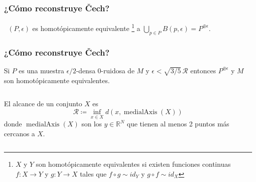 \documentclass{beamer}
\newcommand{\R}{\mathbb{R}}
\newcommand{\RR}{\mathcal{R}}
\DeclareMathOperator{\medialAxis}{medialAxis}
\DeclareMathOperator{\Cech}{\check{C}}
\DeclareMathOperator{\nerve}{nerve}
\begin{document}
\begin{frame}\frametitle{¿Cómo reconstruye \v{C}ech?}

  \begin{Teorema}[Nervio]
    \(\Cech(P,\epsilon)\) es homotópicamente equivalente%
    \footnote[frame]{\(X\) y \(Y\) son homotópicamente equivalentes si existen
    funciones continuas \(f\colon X \to Y\) y \(g\colon Y \to X\)
    tales que \(f\circ g \sim id_Y\) y \(g\circ f \sim id_X\)}
    a \(\bigcup_{p\in P} B(p,\epsilon) = P^{\oplus\epsilon}\).  
  \end{Teorema}

\end{frame}

\begin{frame}\frametitle{¿Cómo reconstruye \v{C}ech?}
  \begin{Teorema}
    Si \(P\) es una muestra \(\epsilon/2\)-densa \(0\)-ruidosa de \(M\)
    y \(\epsilon < \sqrt{3/5}\, \RR\) entonces 
    \(P^{\oplus\epsilon}\) y \(M\) son homotópicamente equivalentes.
  \end{Teorema}
  \begin{columns}
    \centering{}
    El alcance de un conjunto \(X\) es 
    \[ 
      \RR \coloneqq \inf_{x\in X} d(x, \medialAxis(X))
    \]
    donde \(\medialAxis(X)\) son los \(y\in \R^N\) que
    tienen al menos 2 puntos más cercanos a \(X\). 
  \end{columns}
\end{frame}
\end{document}
